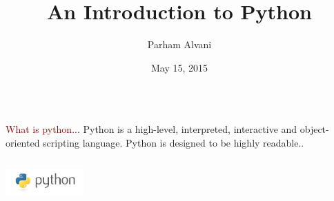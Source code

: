 \documentclass{beamer}
\title[Introduction]{An Introduction to Python}
\author{Parham Alvani}
\institute[AUT] {
  Amirkabir University of Technology \\
  \medskip
  {\small\tt parham.alvani@gmail.com}
}
\date{May 15, 2015}
\begin{document}
\begin{frame}
\titlepage
\end{frame}


\section{}
\subsection{}

\begin{frame}
\begin{columns}
	\begin{column}{10cm}
		\vspace{2cm}
		\begin{block}{
				\centering\textcolor{darkred}{What is python...}}
				\justifying
				Python is a high-level, interpreted, interactive and object-oriented scripting language. Python is designed to be highly readable..\\
		\end{block}
	\end{column}
\end{columns}
\vspace{.75cm}
\hspace*{8.5cm}\includegraphics[width=3cm]{figs/python.jpeg}
\end{frame}
\end{document}
